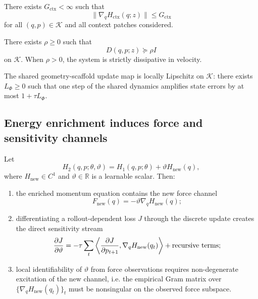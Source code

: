 \begin{assumption}
\label{ass:bounded_ctx}
There exists \(G_{\mathrm{ctx}}<\infty\) such that
\[
    \|\nabla_q H_{\mathrm{ctx}}(q;z)\|\le G_{\mathrm{ctx}}
\]
for all \((q,p)\in\mathcal K\) and all context patches considered.
\end{assumption}

\begin{assumption}
\label{ass:diss}
There exists \(\rho\ge 0\) such that
\[
    D(q,p;z)\succeq \rho I
\]
on \(\mathcal K\). When \(\rho>0\), the system is strictly dissipative in velocity.
\end{assumption}

\begin{assumption}
\label{ass:lipschitz_rollout}
The shared geometry-scaffold update map is locally Lipschitz on \(\mathcal K\): there exists
\(L_\Phi\ge 0\) such that one step of the shared dynamics amplifies state errors by at
most \(1+\tau L_\Phi\).
\end{assumption}

\subsection{Energy enrichment induces force and sensitivity channels}

\begin{lemma}
\label{lem:enrichment_channels}
Let
\[
    H_2(q,p;\theta,\vartheta)
    =
    H_1(q,p;\theta)+\vartheta H_{\mathrm{new}}(q),
\]
where \(H_{\mathrm{new}}\in C^1\) and \(\vartheta\in\mathbb R\) is a learnable scalar.
Then:
\begin{enumerate}
    \item the enriched momentum equation contains the new force channel
    \[
        F_{\mathrm{new}}(q)=-\vartheta\nabla_q H_{\mathrm{new}}(q);
    \]
    \item differentiating a rollout-dependent loss \(J\) through the discrete update
    creates the direct sensitivity stream
    \[
        \frac{\partial J}{\partial \vartheta}
        =
        -\tau\sum_t
        \left\langle
        \frac{\partial J}{\partial p_{t+1}},
        \nabla_qH_{\mathrm{new}}(q_t)
        \right\rangle
        +
        \textnormal{recursive terms};
    \]
    \item local identifiability of \(\vartheta\) from force observations requires
    non-degenerate excitation of the new channel, i.e. the empirical Gram matrix
    over \(\{\nabla_qH_{\mathrm{new}}(q_t)\}_t\) must be nonsingular on the
    observed force subspace.
\end{enumerate}
\end{lemma}

